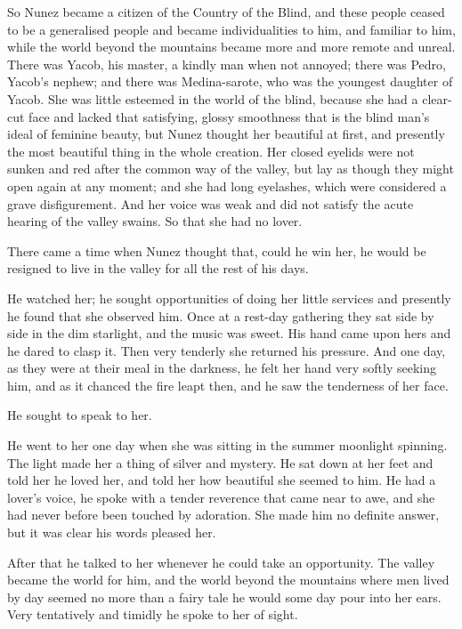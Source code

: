 \documentclass[submission]{sffms}
\begin{document}
So Nunez became a citizen of the Country of the Blind, and these
people ceased to be a generalised people and became individualities to
him, and familiar to him, while the world beyond the mountains became
more and more remote and unreal. There was Yacob, his master, a kindly
man when not annoyed; there was Pedro, Yacob's nephew; and there was
Medina-sarote, who was the youngest daughter of Yacob. She was little
esteemed in the world of the blind, because she had a clear-cut face
and lacked that satisfying, glossy smoothness that is the blind man's
ideal of feminine beauty, but Nunez thought her beautiful at first,
and presently the most beautiful thing in the whole creation. Her
closed eyelids were not sunken and red after the common way of the
valley, but lay as though they might open again at any moment; and she
had long eyelashes, which were considered a grave disfigurement. And
her voice was weak and did not satisfy the acute hearing of the valley
swains. So that she had no lover.

There came a time when Nunez thought that, could he win her, he would
be resigned to live in the valley for all the rest of his days.

He watched her; he sought opportunities of doing her little services
and presently he found that she observed him. Once at a rest-day
gathering they sat side by side in the dim starlight, and the music
was sweet. His hand came upon hers and he dared to clasp it. Then very
tenderly she returned his pressure. And one day, as they were at their
meal in the darkness, he felt her hand very softly seeking him, and as
it chanced the fire leapt then, and he saw the tenderness of her face.

He sought to speak to her.

He went to her one day when she was sitting in the summer moonlight
spinning.  The light made her a thing of silver and mystery. He sat
down at her feet and told her he loved her, and told her how beautiful
she seemed to him. He had a lover's voice, he spoke with a tender
reverence that came near to awe, and she had never before been touched
by adoration. She made him no definite answer, but it was clear his
words pleased her.

After that he talked to her whenever he could take an opportunity. The
valley became the world for him, and the world beyond the mountains
where men lived by day seemed no more than a fairy tale he would some
day pour into her ears. Very tentatively and timidly he spoke to her
of sight.
\end{document}

